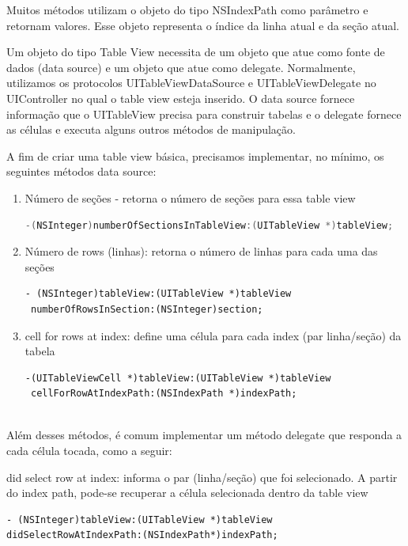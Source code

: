 	Muitos métodos utilizam o objeto do tipo NSIndexPath como parâmetro e retornam valores. Esse objeto representa o índice da linha atual e da seção atual.
    
	Um objeto do tipo Table View necessita de um objeto que atue como fonte de dados (data source) e um objeto que atue como delegate. Normalmente, utilizamos os protocolos UITableViewDataSource e UITableViewDelegate no UIController no qual o table view esteja inserido. O data source fornece informação que o UITableView precisa para construir tabelas e o delegate fornece as células e executa alguns outros métodos de manipulação.
    
	A fim de criar uma table view básica, precisamos implementar, no mínimo, os seguintes métodos data source:
\begin{enumerate}
\item Número de seções - retorna o número de seções para essa table view

\begin{lstlisting}[language=C]   
-(NSInteger)numberOfSectionsInTableView:(UITableView *)tableView;
\end{lstlisting}   
	   
\item Número de rows (linhas): retorna o número de linhas para cada uma das seções

\begin{lstlisting}  
- (NSInteger)tableView:(UITableView *)tableView
 numberOfRowsInSection:(NSInteger)section;  
\end{lstlisting}  
   
\item cell for rows at index: define uma célula para cada index (par linha/seção) da tabela
\begin{lstlisting}    
-(UITableViewCell *)tableView:(UITableView *)tableView
 cellForRowAtIndexPath:(NSIndexPath *)indexPath;
     
\end{lstlisting}

\end{enumerate} 

    Além desses métodos, é comum implementar um método delegate que responda a cada célula tocada, como a seguir:
 
    did select row at index: informa o par (linha/seção) que foi selecionado. A partir do index path, pode-se recuperar a célula selecionada dentro da table view
\begin{lstlisting}
- (NSInteger)tableView:(UITableView *)tableView 
didSelectRowAtIndexPath:(NSIndexPath*)indexPath;  
\end{lstlisting}   
     
